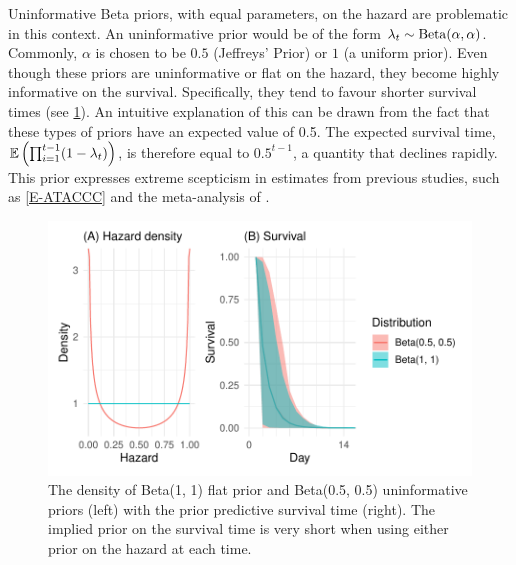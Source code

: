 \documentclass[thesis.tex]{subfiles}
\begin{document}
Uninformative Beta priors, with equal parameters, on the hazard are problematic in this context.
An uninformative prior would be of the form $\lambda_t \sim \operatorname{Beta}(\alpha, \alpha)$.
Commonly, $\alpha$ is chosen to be $0.5$ (Jeffreys' Prior) or $1$ (a uniform prior).
Even though these priors are uninformative or flat on the hazard, they become highly informative on the survival. 
Specifically, they tend to favour shorter survival times (see \cref{perf-test:fig:flat-prior}).
An intuitive explanation of this can be drawn from the fact that these types of priors have an expected value of 0.5.
The expected survival time, $\operatorname{\mathbb{E}} \left( \prod_{i=1}^{t-1} (1-\lambda_t) \right)$, is therefore equal to $0.5^{t-1}$, a quantity that declines rapidly.
This prior expresses extreme scepticism in estimates from previous studies, such as \cref{E-ATACCC} and the meta-analysis of \textcite{cevikShedding}.
\begin{figure}
  \centering \includegraphics{cis-perfect-testing/flat-prior}
  \caption[Uninformative priors for the hazard]{The density of Beta(1, 1) flat prior and Beta(0.5, 0.5) uninformative priors (left) with the prior predictive survival time (right). The implied prior on the survival time is very short when using either prior on the hazard at each time. \label{perf-test:fig:flat-prior}}
\end{figure}
\end{document}
